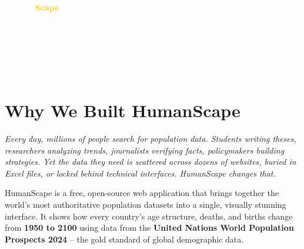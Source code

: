 \documentclass[12pt,a4paper]{article}
\begin{document}
\thispagestyle{empty}

\vspace*{3cm}
\begin{center}
\textcolor{white}{%

\vspace{1cm}

{\Huge\bfseries Human\textcolor{gold}{Scape}}

\vspace{0.5cm}

{\large An open-source demography atlas that makes the world's population data
visible, interactive, and accessible to everyone}

\vspace{3cm}

{\small\textcolor{gray!70}{GeoScape Analytics Lab}\\[0.3cm]
{\small\textcolor{gray!50}{Published September 2026 $\vert$ Open Source $\vert$ CC BY 3.0 IGO}}}
}
\end{center}
\newpage

\section{Why We Built HumanScape}

\textit{Every day, millions of people search for population data. Students writing
theses, researchers analyzing trends, journalists verifying facts, policymakers
building strategies. Yet the data they need is scattered across dozens of websites,
buried in Excel files, or locked behind technical interfaces. HumanScape changes that.}

\vspace{0.3cm}

HumanScape is a free, open-source web application that brings together the world's
most authoritative population datasets into a single, visually stunning interface.
It shows how every country's age structure, deaths, and births change from
\textbf{1950 to 2100} using data from the \textbf{United Nations World Population
Prospects 2024} -- the gold standard of global demographic data.
\end{document}
